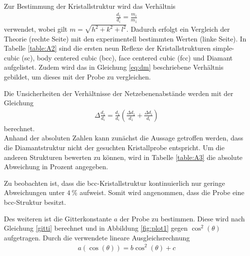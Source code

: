 Zur Bestimmung der Kristallstruktur wird das Verhältnis
\begin{align}
	\frac{d_1}{d_i}=\frac{m_i}{m_1}
	\label{eq:dm}
\end{align}
verwendet, wobei gilt $m=\sqrt{h^2+k^2+l^2}$. Dadurch erfolgt ein Vergleich der Theorie (rechte Seite) mit den experimentell bestimmten Werten (linke Seite).
In Tabelle \ref{table:A2} sind die ersten neun Reflexe der Kristallstrukturen simple-cubic (sc), body centered cubic (bcc), face centered cubic (fcc) und Diamant aufgelistet. Zudem wird das in Gleichung \ref{eq:dm} beschriebene Verhältnis gebildet, um dieses mit der Probe zu vergleichen.



Die Unsicherheiten der Verhältnisse der Netzebenenabstände werden mit der Gleichung
\begin{align}
	\Delta\frac{d_1}{d_i}=\frac{d_1}{d_i}\left(\frac{\Delta d_1}{d_1} + \frac{\Delta d_i}{d_i}\right)
\end{align}
berechnet.\\
Anhand der absoluten Zahlen kann zunächst die Aussage getroffen werden, dass die Diamantstruktur nicht der gesuchten Kristallprobe entspricht. Um die anderen Strukturen bewerten zu können, wird in Tabelle \ref{table:A3} die absolute Abweichung in Prozent angegeben.



Zu beobachten ist, dass die bcc-Kristallstruktur kontinuierlich nur geringe Abweichungen unter $\SI{4}{\percent}$ aufweist. Somit wird angenommen, dass die Probe eine bcc-Struktur besitzt.

Des weiteren ist die Gitterkonstante $a$ der Probe zu bestimmen. Diese wird nach Gleichung \eqref{gitti} berechnet und in Abbildung \ref{fig:plot1} gegen $\cos^2{(\theta)}$ aufgetragen. Durch die verwendete lineare Ausgleichsrechnung
\begin{align}
	a(\cos{(\theta)})= b\cos^2{(\theta)} + c
	\label{eq:FIT}
\end{align}

